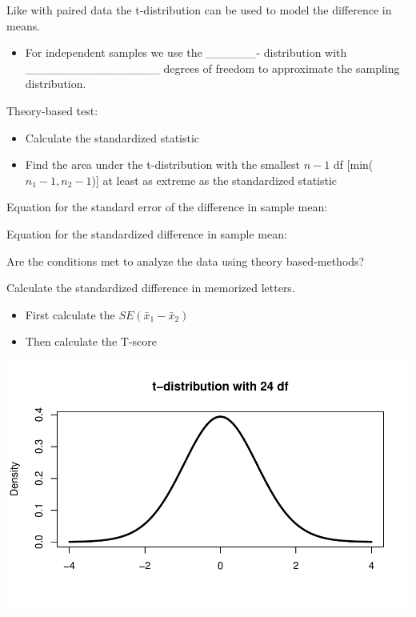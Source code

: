 \documentclass[
]{report}
\providecommand{\tightlist}{%
  \setlength{\itemsep}{0pt}\setlength{\parskip}{0pt}}
\begin{document}
\vspace{1in}

Like with paired data the t-distribution can be used to model the difference in means.


\begin{itemize}
\tightlist
\item
  For independent samples we use the \_\_\_\_\_\_- distribution
  with \_\_\_\_\_\_\_\_\_\_\_\_\_\_\_\_ degrees of freedom to approximate the sampling distribution.
\end{itemize}


Theory-based test:

\begin{itemize}
\item
  Calculate the standardized statistic
\item
  Find the area under the t-distribution with the smallest \(n - 1\) df {[}min(\(n_1-1, n_2-1\)){]} at least as extreme as the standardized statistic
\end{itemize}

Equation for the standard error of the difference in sample mean:

\vspace{0.5in}

Equation for the standardized difference in sample mean:

\vspace{0.5in}

Are the conditions met to analyze the data using theory based-methods?

\vspace{0.8in}

Calculate the standardized difference in memorized letters.

\begin{itemize}
\tightlist
\item
  First calculate the \(SE(\bar{x}_1 - \bar{x}_2)\)
\end{itemize}

\vspace{0.6in}

\begin{itemize}
\tightlist
\item
  Then calculate the T-score
\end{itemize}

\vspace{1in}

\begin{center}\includegraphics[width=0.7\linewidth]{12-LN012-1ofeach_files/figure-latex/pvaluepb-1} \end{center}
\end{document}
